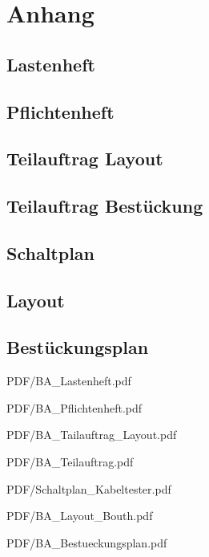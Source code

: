 \section{Anhang}

\subsection{Lastenheft}
\subsection{Pflichtenheft}
\subsection{Teilauftrag Layout}
\subsection{Teilauftrag Bestückung}
\subsection{Schaltplan}
\subsection{Layout}
\subsection{Bestückungsplan}



 {PDF/BA_Lastenheft.pdf}

 {PDF/BA_Pflichtenheft.pdf}

 {PDF/BA_Tailauftrag_Layout.pdf}

 {PDF/BA_Teilauftrag.pdf}

 {PDF/Schaltplan_Kabeltester.pdf}

 {PDF/BA_Layout_Bouth.pdf}

 {PDF/BA_Bestueckungsplan.pdf}



